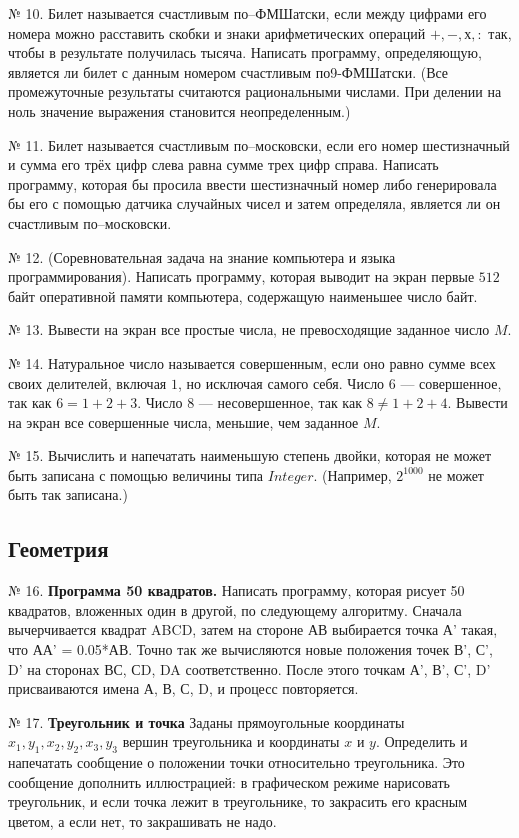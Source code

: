 {№ 10. Билет называется счастливым по--ФМШатски, если между цифрами его номера можно расставить скобки и знаки арифметических операций $+, -, х , :$ так, чтобы в результате получилась тысяча. Написать программу, определяющую, является ли билет с данным номером счастливым по9-ФМШатски. (Все промежуточные результаты считаются рациональными числами. При делении на ноль значение выражения становится неопределенным.)

№ 11. Билет называется счастливым по--московски, если его номер шестизначный и сумма его трёх цифр слева равна сумме трех цифр справа. Написать программу, которая бы просила ввести шестизначный номер либо генерировала бы его с помощью датчика случайных чисел и затем определяла, является ли он счастливым по--московски.

№ 12. (Соревновательная задача на знание компьютера и языка программирования). Написать программу, которая выводит на экран первые $512$ байт оперативной памяти компьютера, содержащую наименьшее число байт.

№ 13. Вывести на экран все простые числа, не превосходящие заданное число $M$.

№ 14. Натуральное число называется совершенным, если оно равно сумме всех своих делителей, включая $1$, но исключая самого себя. Число $6$ --- совершенное, так как $6 = 1 + 2 + 3$. Число $8$ --- несовершенное, так как $8\neq 1 + 2 + 4$. Вывести на экран все совершенные числа, меньшие, чем заданное $M$.

№ 15. Вычислить и напечатать наименьшую степень двойки, которая не может быть записана с помощью величины типа $Integer$. (Например, $2^{1000}$ не может быть так записана.)

\subsection{Геометрия}

№ 16. {\bf Программа 50 квадратов.} Написать программу, которая рисует 50 квадратов, вложенных один в другой, по следующему алгоритму. Сначала вычерчивается квадрат ABCD, затем на стороне АВ выбирается точка А' такая, что АА' = 0.05*АВ. Точно так же вычисляются новые положения точек В', С', D' на сторонах ВС, СD, DA соответственно. После этого точкам А', В', С', D' присваиваются имена А, В, С, D, и процесс повторяется.

№ 17. {\bf Треугольник и точка} 
Заданы   прямоугольные координаты $x_1, y_1,x_2,y_2,x_3,y_3$ вершин треугольника и координаты $x$ и $y$. Определить и напечатать сообщение о положении точки относительно треугольника. Это сообщение дополнить иллюстрацией: в графическом режиме нарисовать треугольник, и если точка лежит в треугольнике, то закрасить его красным цветом, а если нет, то закрашивать не надо.

}

